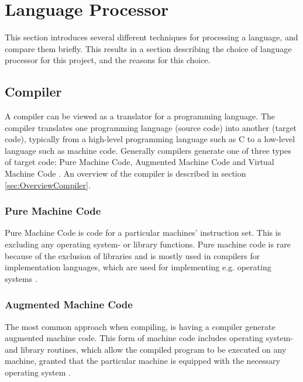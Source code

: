 \section{Language Processor}
This section introduces several different techniques for processing a language, and compare them briefly. This results in a section describing the choice of language processor for this project, and the reasons for this choice.

\subsection{Compiler}
A compiler can be viewed as a translator for a programming language. The compiler translates one programming language (source code) into another (target code), typically from a high-level programming language such as C to a low-level language such as machine code. Generally compilers generate one of three types of target code: Pure Machine Code, Augmented Machine Code and Virtual Machine Code \citep{CraftingACompiler}. An overview of the compiler is described in section \ref{sec:OverviewCompiler}.

\subsubsection{Pure Machine Code} 
Pure Machine Code is code for a particular machines' instruction set. This is excluding any operating system- or library functions. Pure machine code is rare because of the exclusion of libraries and is mostly used in compilers for implementation languages, which are used for implementing e.g. operating systems \citep{CraftingACompiler}.
 
\subsubsection{Augmented Machine Code}
The most common approach when compiling, is having a compiler generate augmented machine code. This form of machine code includes operating system- and library routines, which allow the compiled program to be executed on any machine, granted that the particular machine is equipped with the necessary operating system \citep{CraftingACompiler}.

